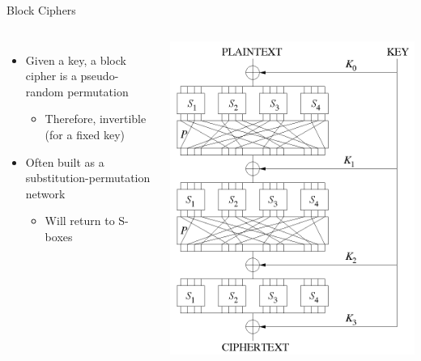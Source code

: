 \documentclass[ignorenonframetext,]{beamer}
\providecommand{\tightlist}{%
  \setlength{\itemsep}{0pt}\setlength{\parskip}{0pt}}
\newcommand{\columnsbegin}{\begin{columns}}
\newcommand{\columnsend}{\end{columns}}
\begin{document}
\begin{frame}{Block Ciphers}

\columnsbegin


\begin{itemize}
\tightlist
\item
  Given a key, a block cipher is a pseudo-random permutation

  \begin{itemize}
  \tightlist
  \item
    Therefore, invertible (for a fixed key)
  \end{itemize}
\item
  Often built as a substitution-permutation network

  \begin{itemize}
  \tightlist
  \item
    Will return to S-boxes
  \end{itemize}
\end{itemize}


\includegraphics[width=\textwidth]{images/spn2.png}

\columnsend

\end{frame}
\end{document}

